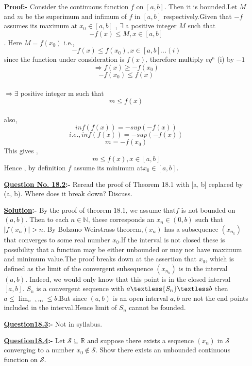 \documentclass[12pt]{article}
\newcommand{\N}{\mathbb{N}}
\begin{document}
\textbf{\underline{Proof}:-} Consider the continuous function $f$ on $[a,b]$. Then it is bounded.Let $M$ and $m$ be the superimum and infimum of $f$ in $[a,b]$ respectively.Given that $-f$ assumes its maximum at $x_{0} \in [a,b]$ , $\exists$ a positive integer $M$ such that  $$-f(x) \leq M ,x \in [a,b]$$.  Here $  M = f(x_{0})$ i.e.,$$-f(x) \leq f(x_0) , x \in[a,b] \ldots (i)$$
since the function under consideration is $f(x)$, therefore multiply $eq^{n}$ (i) by $-1$
$$\Rightarrow f(x) \geq -f(x_0)$$
 $$-f(x_0) \leq f(x)$$\\ $\Rightarrow \exists$ positive integer m such that$$ m \leq f(x)$$\\also,          $$inf (f(x)) = -sup(-f(x))$$
 $$ i.e., inf (f(x)) = -sup(-f(x))$$
 $$m = -f(x_0)$$
 This gives ,$$m \leq f(x) , x \in [a,b]$$Hence , by definition $f$ assume its minimum at$x_0 \in [a,b].$
\pagebreak

\begin{mdframed}[style=MyFrame]
\textbf{\underline{Question No. 18.2}:-} Reread the proof of Theorem 18.1 with [a, b] replaced by\\ (a, b). Where does it break down? Discuss.\\
\end{mdframed}
 \vspace*{1cm}

\textbf{\underline{Solution}:-} By the proof of theorem $18.1$, we assume that$f$ is not bounded on $ (a,b)$. Then to each $n\in \N$, these corresponds an $x_n\in(0,b)$ such that $|{f(x_n)}|>n$. By Bolzano-Weirstrass theorem,$ (x_n)$ has a subsequence $(x_{n_{k}})$ that converges to some real number $x_{0}$.If the interval is not closed these is possibility that a function may be either unbounded or may not have maximum and minimum value.The proof breaks down  at the assertion that $x_{0}$, which is defined as the limit of the convergent subsequence $(x_{n_{k}})$ is in the interval $(a,b)$. Indeed, we would only know that this point is in the closed interval$ [a,b]$. ${S_{n}}$ is a convergent sequence with $a\textless {S_{n}}\textless b$ then $a\leq \lim_{n\to \infty} \leq b$.But since $(a,b)$ is an open interval $a,b$ are not the end points included in the interval.Hence limit of $S_{n}$ cannot be founded.\\

\vspace*{1cm}

\begin{mdframed}[style=MyFrame]
\textbf{\underline{Question18.3}:-} Not in syllabus.\\
\end{mdframed}
\vspace*{1cm}
\begin{mdframed}[style=MyFrame]
\textbf{\underline{Question18.4}:-} Let $\mathcal{S} \subseteq \mathbb{R}$ and suppose there exists a sequence $(x_{n})$ in $\mathcal{S}$ converging to a number $x_{0}\notin \mathcal{S} $. Show there exists an unbounded continuous
function on $\mathcal{S}$.\\
\end{mdframed}
\end{document}
